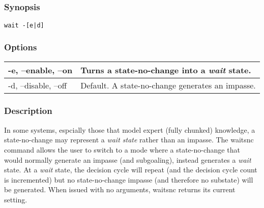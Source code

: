 \subsection{}
\label{waitsnc}
\subsubsection*{Synopsis}
\begin{verbatim}
wait -[e|d]
\end{verbatim}
\subsubsection*{Options}
\begin{tabular}{|l|l|}
\hline 
 -e, --enable, --on  & Turns a state-no-change into a \emph{wait}
 state.  \\
 \hline 
 -d, --disable, --off  & Default. A state-no-change generates an impasse.  \\
 \hline 
\end{tabular}
\subsubsection*{Description}
 In some systems, espcially those that model expert (fully chunked) knowledge, a state-no-change may represent a \emph{wait state}
 rather than an impasse. The waitsnc command allows the user to switch to a mode where a state-no-change that would normally generate an impasse (and subgoaling), instead generates a \emph{wait}
 state. At a \emph{wait}
 state, the decision cycle will repeat (and the decision cycle count is incremented) but no state-no-change impasse (and therefore no substate) will be generated. 
 When issued with no arguments, waitsnc returns its current setting. 
